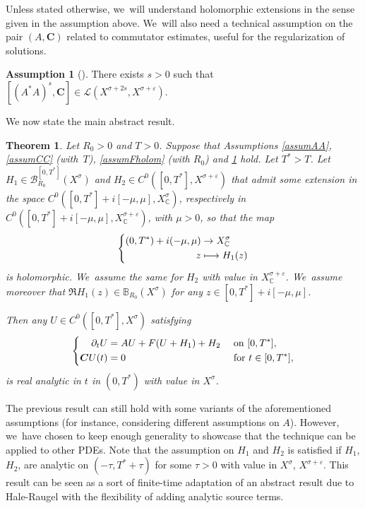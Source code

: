 \documentclass[10pt]{amsart}
\newcommand\mto{\mathchoice{\longmapsto}{\mapsto}{\mapsto}{\mapsto}}
\newtheorem{theorem}{Theorem}[section]
\theoremstyle{definition}
\newtheorem{assum}{Assumption}
\newenvironment{assump}[2][]
{\renewcommand\theassum{#2}\begin{assum}[#1]}
{\end{assum}}
\let\mc\mathcal
\let\veps\varepsilon
\newcommand{\B}{\mc{B}}
\newcommand{\bC}{\boldsymbol{C}}
\begin{document}
Unless stated otherwise, we~will understand holomorphic extensions in the sense given in the assumption above. We~will also need a technical assumption on the pair $(A, \bC)$ related to commutator estimates, useful for the regularization of solutions.
\begin{assump}{4}
\label{assumcommu}
There exists $s>0$ such that $[(A^*A)^s,\bC]\in \mc{L}(X^{\sigma+2s}, X^{\sigma+\veps})$.
\end{assump}

We now state the main abstract result.

\begin{theorem}\label{thmabstractanalyticintro}
Let $R_{0}\!>\!0$ and $T\!>\!0$. Suppose that Assumptions \ref{assumAA}, \ref{assumCC} (with~$T$), \ref{assumFholom} (with $R_{0}$) and \ref{assumcommu} hold. Let $T^{*}\!>\!T$. Let $H_{1}\in \B_{R_{0}}^{[0,T^{*}]}(X^{\sigma})$ and $H_{2}\in C^{0}([0,T^{*}],X^{\sigma+\veps})$ that admit some extension in the space $C^{0}([0,T^{*}]+i[-\mu,\mu],X^{\sigma}_{\mathbb{C}})$, respectively in \hbox{$C^{0}([0,T^{*}]+i[-\mu,\mu],X^{\sigma+\veps}_{\mathbb{C}})$}, with $\mu\!>\!0$, so that the map
\begin{align*}
\left\{\begin{aligned}
(0,T^{*})+i(-\mu,\mu) & \to X^{\sigma}_{\mathbb{C}}\\
z&\mto H_{1}(z)
\end{aligned}\right.
\end{align*}
is holomorphic. We~assume the same for $H_{2}$ with value in $X^{\sigma+\veps}_{\mathbb{C}}$. We~assume moreover that $\Re H_{1}(z)\in \mathbb{B}_{R_0}(X^{\sigma})$ for any $z\in [0,T^{*}]+i[-\mu,\mu]$.

Then any $U\in C^{0}([0,T^{*}],X^{\sigma})$ satisfying
\begin{align}\label{UCabstractT*intro}
\left\{\begin{aligned}
\partial_t U&=AU+F(U+H_{1})+H_{2}&& \textnormal{ on } [0,T^{*}], \\
\bC U(t)&=0 &&\textnormal{ for }t\in [0,T^{*}],
\end{aligned}\right.
\end{align}
is real analytic in $t$ in $(0,T^*)$ with value in $X^{\sigma}$.
\end{theorem}

The previous result can still hold with some variants of the aforementioned assumptions (for instance, considering different assumptions on $A$). However, we~have chosen to keep enough generality to showcase that the technique can be applied to other PDEs. Note that the assumption on $H_1$ and $H_2$ is satisfied if $H_1$, \resp $H_2$, are analytic on $(-\tau,T^*+\tau)$ for some $\tau>0$ with value in $X^{\sigma}$, \resp $X^{\sigma+\veps}$. This result can be seen as a sort of finite-time adaptation of an abstract result due to Hale-Raugel \cite[Th.\,2.5]{HR03} with the flexibility of adding analytic source terms.
\end{document}
